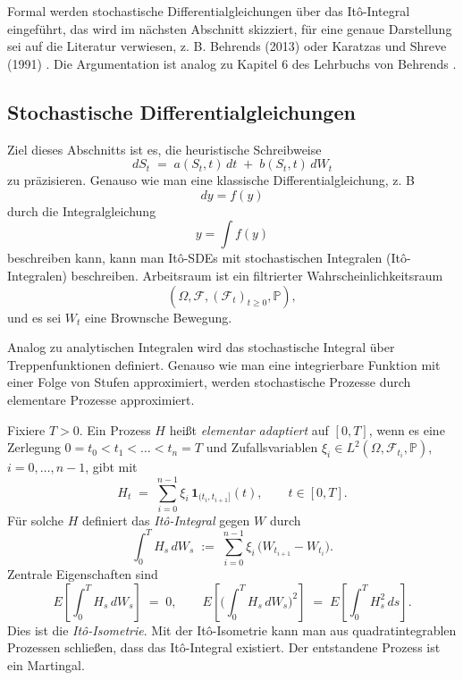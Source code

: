 Formal werden stochastische Differentialgleichungen über das It\^o-Integral eingeführt, das wird 
im nächsten Abschnitt skizziert, für eine genaue Darstellung sei auf die Literatur verwiesen, z. B. Behrends (2013) \cite{behrends} oder Karatzas und Shreve (1991) \cite{karatzas_brownian_1991}.
Die Argumentation ist analog zu Kapitel 6 des Lehrbuchs von Behrends \cite{behrends}.

\subsection{Stochastische Differentialgleichungen}
Ziel dieses Abschnitts ist es, die heuristische Schreibweise
$$
dS_t \;=\; a(S_t,t)\,dt \;+\; b(S_t,t)\,dW_t
$$
zu präzisieren. Genauso wie man eine klassische Differentialgleichung, z. B
$$dy = f(y)$$
durch die Integralgleichung
$$y = \int f(y)$$
beschreiben kann, kann man It\^o-SDEs mit stochastischen Integralen (It\^o-Integralen) beschreiben.
Arbeitsraum ist ein filtrierter Wahrscheinlichkeitsraum
$$
(\Omega,\mathcal F,(\mathcal F_t)_{t\ge 0},\mathbb P),
$$
und es sei $W_t$ eine Brownsche Bewegung. 

Analog zu analytischen Integralen
wird das stochastische Integral über Treppenfunktionen definiert. 
Genauso wie man eine integrierbare Funktion mit einer Folge von Stufen approximiert, werden
stochastische Prozesse durch elementare Prozesse approximiert.

\begin{defi}
Fixiere $T>0$. Ein Prozess $H$ heißt \emph{elementar adaptiert} auf $[0,T]$, wenn es eine Zerlegung $0=t_0<t_1<\dots<t_n=T$ und Zufallsvariablen $\xi_i\in L^2(\Omega,\mathcal F_{t_i},\mathbb P)$, $i=0,\dots,n-1$, gibt mit
$$
H_t \;=\; \sum_{i=0}^{n-1} \xi_i\,\mathbf 1_{(t_i,t_{i+1}]}(t),\qquad t\in[0,T].
$$
Für solche $H$ definiert das \emph{It\^o-Integral} gegen $W$ durch
$$
\int_0^T H_s\,dW_s \;:=\; \sum_{i=0}^{n-1} \xi_i\,\big(W_{t_{i+1}}-W_{t_i}\big).
$$
Zentrale Eigenschaften sind
$$
E\!\left[\int_0^T H_s\,dW_s\right] \;=\; 0,\qquad
E\!\left[\Big(\int_0^T H_s\,dW_s\Big)^{\!2}\right] \;=\; E\!\left[\int_0^T H_s^2\,ds\right].
$$
Dies ist die \emph{It\^o-Isometrie}. Mit der It\^o-Isometrie kann man aus quadratintegrablen Prozessen schließen, dass das It\^o-Integral existiert. Der entstandene Prozess ist ein Martingal.
\end{defi}


